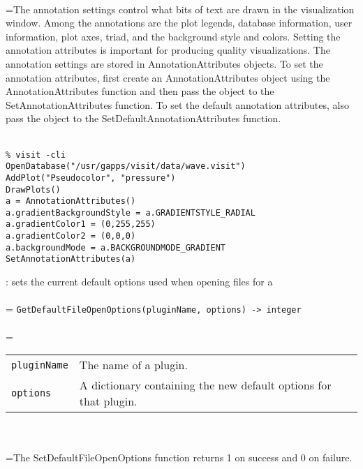 \documentclass[10pt,a4paper]{report}
\begin{document}
 \\ 
\hangindent=\parindent The annotation settings control what bits of text are drawn in the visualization window. Among the annotations are the plot legends, database information, user information, plot axes, triad, and the background style and colors. Setting the annotation attributes is important for producing quality visualizations. The annotation settings are stored in AnnotationAttributes objects. To set the annotation attributes, first create an AnnotationAttributes object using the AnnotationAttributes function and then pass the object to the SetAnnotationAttributes function. To set the default annotation attributes, also pass the object to the SetDefaultAnnotationAttributes function. \\[-3mm] 

\\[-6mm]
\begin{verbatim}% visit -cli
OpenDatabase("/usr/gapps/visit/data/wave.visit")
AddPlot("Pseudocolor", "pressure")
DrawPlots()
a = AnnotationAttributes()
a.gradientBackgroundStyle = a.GRADIENTSTYLE_RADIAL
a.gradientColor1 = (0,255,255)
a.gradientColor2 = (0,0,0)
a.backgroundMode = a.BACKGROUNDMODE_GRADIENT
SetAnnotationAttributes(a)
\end{verbatim}
\newpage


{}
: sets the current default options used when opening files for a\\[-3mm]

 \\ 
\hangindent=\parindent 
\verb!GetDefaultFileOpenOptions(pluginName, options) -> integer!\\ [-3mm]

 \\ 
\hangindent=\parindent 
\begin{tabular}{lp{9cm}}
\verb!pluginName! & The name of a plugin. \\
\verb!options! & A dictionary containing the new default options for that plugin. \\
\end{tabular} \\[-2mm]


 \\ 
\hangindent=\parindent The SetDefaultFileOpenOptions function returns 1 on success and 0 on failure. \\[-3mm] 
\end{document}
